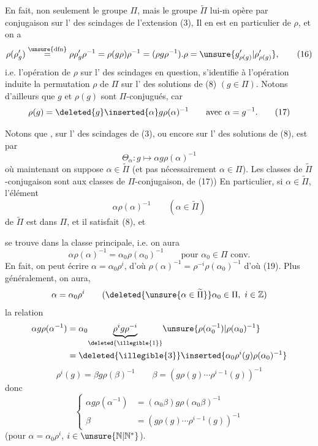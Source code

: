 En fait, non seulement le groupe $\Pi$, mais le groupe $\widetilde\Pi$ lui-$\overline{\mathrm m}$ opère par conjugaison sur l' des scindages de l'extension (3), Il en est en particulier  de $\rho$, et on a
\[
\rho(\rho'_g)\overset{\unsure{\mathrm{dfn}}}{=}
\rho\rho'_g\rho^{-1}=\rho(g\rho)\rho^{-1}
=(\rho g\rho^{-1}).\rho=\unsure{g'_{\rho(g)}|\rho'_{\rho(g)}}, \tag{16}
\]
i.e. l'opération de $\rho$ sur l' des scindages en question, s'identifie à l'opération  induite  la permutation $\rho$ de $\Pi$ sur l' des solutions de (8) $(g\in\Pi)$. Notons d'ailleurs que $g$ et $\rho(g)$  sont $\Pi$-conjugués, car
\[
\rho(g)=\deleted{g}\inserted{\alpha}g\rho(\alpha)^{-1}\qquad\text{avec }\alpha=g^{-1}. \tag{17}
\]

Notons que \deleted{\unsure{$\rho$}}, sur l' des scindages de (3), ou encore sur l' des solutions de (8), est   par
\[
\Theta_\alpha:g\longmapsto\alpha g\rho(\alpha)^{-1} \tag{10}
\]
où maintenant on suppose $\alpha\in\widetilde\Pi$ (et pas nécessairement $\alpha\in\Pi$). Les classes de $\widetilde\Pi$-conjugaison sont  aux classes de $\Pi$-conjugaison,   de (17))  En particulier, si $\alpha\in\widetilde\Pi$, l'élément
\[
\alpha\rho(\alpha)^{-1}\qquad(\alpha\in\widetilde\Pi) \tag{18}
\]
de $\widetilde\Pi$ est dans $\Pi$, et il  satisfait (8), et


se trouve dans la classe principale, i.e. on aura
\[
\alpha\rho(\alpha)^{-1}=\alpha_0\rho(\alpha_0)^{-1}\qquad\text{pour }\alpha_0\in\Pi\text{ conv.}
\]
En fait, on peut écrire $\alpha=\alpha_0\rho^i$, d'où $\rho(\alpha)^{-1}=\rho^{-i}\rho(\alpha_0)^{-1}$ d'où (19). Plus généralement, on aura, 
\[
\alpha=\alpha_0\rho^i\qquad(\deleted{\unsure{\alpha\in\widetilde\Pi}}\alpha_0\in\Pi,\ i\in\mathbb Z)
\]
la relation
\[
\begin{aligned}
\alpha g\rho(\alpha^{-1})
&=\alpha_0\underset{\deleted{\illegible{1}}}{\underbrace{\rho^i g\rho^{-i}}}\unsure{\rho(\alpha_0^{-1})|\rho(\alpha_0)^{-1}}\\
&=\deleted{\illegible{3}}\inserted{\alpha_0\rho^i(g)\rho(\alpha_0)^{-1}}
\end{aligned}
\]
\[
\rho^i(g)=\beta g\rho(\beta)^{-1}\qquad
\beta=(g\rho(g)\cdots\rho^{i-1}(g))^{-1}
\]
donc
\[
\left\{\begin{aligned}
\alpha g\rho(\alpha^{-1})&=(\alpha_0\beta)g\rho(\alpha_0\beta)^{-1}\\
\beta&=(g\rho(g)\cdots\rho^{i-1}(g))^{-1}
\end{aligned}\right. \tag{19}
\]
(pour $\alpha=\alpha_0\rho^i$, $i\in\unsure{\mathbb N|\mathbb N^*}$).

